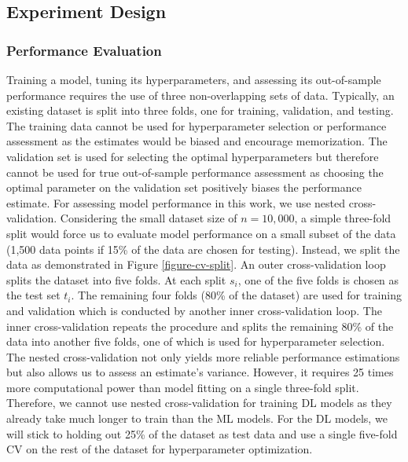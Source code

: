 \subsection{Experiment Design}


\subsubsection{Performance Evaluation}
Training a model, tuning its hyperparameters, and assessing its out-of-sample performance requires the use of three non-overlapping sets of data. Typically, an existing dataset is split into three folds, one for training, validation, and testing. The training data cannot be used for hyperparameter selection or performance assessment as the estimates would be biased and encourage memorization. The validation set is used for selecting the optimal hyperparameters but therefore cannot be used for true out-of-sample performance assessment as choosing the optimal parameter on the validation set positively biases the performance estimate.\newline
For assessing model performance in this work, we use nested cross-validation. Considering the small dataset size of $n=10,000$, a simple three-fold split would force us to evaluate model performance on a small subset of the data (1,500 data points if 15\% of the data are chosen for testing). Instead, we split the data as demonstrated in Figure \ref{figure-cv-split}. An outer cross-validation loop splits the dataset into five folds. At each split $s_i$, one of the five folds is chosen as the test set $t_i$. The remaining four folds (80\% of the dataset) are used for training and validation which is conducted by another inner cross-validation loop. The inner cross-validation repeats the procedure and splits the remaining 80\% of the data into another five folds, one of which is used for hyperparameter selection.\newline
The nested cross-validation not only yields more reliable performance estimations but also allows us to assess an estimate's variance. However, it requires 25 times more computational power than model fitting on a single three-fold split. Therefore, we cannot use nested cross-validation for training DL models as they already take much longer to train than the ML models. For the DL models, we will stick to holding out 25\% of the dataset as test data and use a single five-fold CV on the rest of the dataset for hyperparameter optimization.

